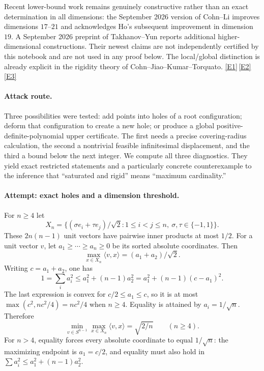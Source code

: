 \documentclass[11pt,a4paper]{article}
\newcommand{\eref}[2]{\hyperlink{extra:#1:#2}{[E#2]}}
\numberwithin{equation}{section}
\begin{document}
Recent lower-bound work remains genuinely constructive rather than an
exact determination in all dimensions: the September 2026 version of
Cohn--Li improves dimensions $17$--$21$ and acknowledges Ho's subsequent
improvement in dimension $19$. A September 2026 preprint of Takhanov--Yun
reports additional higher-dimensional constructions. Their newest claims
are not independently certified by this notebook and are not used in any
proof below. The local/global distinction is already explicit in the
rigidity theory of Cohn--Jiao--Kumar--Torquato. \eref{110}{1}\,\eref{110}{2}\,\eref{110}{3}

\paragraph{Attack route.}
Three possibilities were tested: add points into holes of a root
configuration; deform that configuration to create a new hole; or produce
a global positive-definite-polynomial upper certificate. The first needs
a precise covering-radius calculation, the second a nontrivial feasible
infinitesimal displacement, and the third a bound below the next integer.
We compute all three diagnostics. They yield exact restricted statements
and a particularly concrete counterexample to the inference that
``saturated and rigid'' means ``maximum cardinality.''

\paragraph{Attempt: exact holes and a dimension threshold.}
For $n\geq4$ let
\[
 X_n=\{(\sigma e_i+\tau e_j)/\sqrt2:
           1\leq i<j\leq n,\ \sigma,\tau\in\{-1,1\}\}.
\]
These $2n(n-1)$ unit vectors have pairwise inner products at most $1/2$.
For a unit vector $v$, let $a_1\geq\cdots\geq a_n\geq0$ be its sorted
absolute coordinates. Then
\begin{equation}\label{110:support}
 \max_{x\in X_n}\langle v,x\rangle=(a_1+a_2)/\sqrt2.
\end{equation}
Writing $c=a_1+a_2$, one has
\[
 1=\sum_i a_i^2\leq a_1^2+(n-1)a_2^2
             =a_1^2+(n-1)(c-a_1)^2.
\]
The last expression is convex for $c/2\leq a_1\leq c$, so it is at most
$\max(c^2,nc^2/4)=nc^2/4$ when $n\geq4$. Equality is attained by
$a_i=1/\sqrt n$. Therefore
\begin{equation}\label{110:cover}
 \min_{v\in S^{n-1}}\max_{x\in X_n}\langle v,x\rangle
       =\sqrt{2/n}\qquad(n\geq4).
\end{equation}
For $n>4$, equality forces every absolute coordinate to equal
$1/\sqrt n$: the maximizing endpoint is $a_1=c/2$, and equality must
also hold in $\sum a_i^2\leq a_1^2+(n-1)a_2^2$.
\end{document}
